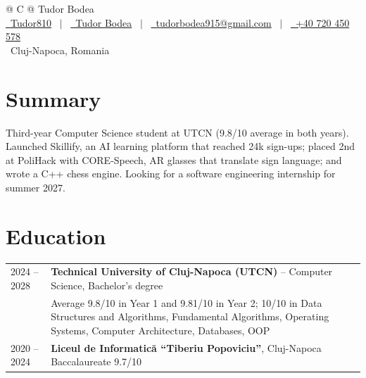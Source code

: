 \documentclass[a4paper,11pt]{article}
\begin{document}
\pagestyle{empty}

\begin{tabularx}{\linewidth}{@{} C @{}}
\Huge{Tudor Bodea} \\[7.5pt]
\href{https://github.com/Tudor810}{\raisebox{-0.05\height}{\faGithub}\ Tudor810} \ $|$ \
\href{https://www.linkedin.com/in/tudor-bodea-32ab5030b/}{\raisebox{-0.05\height}{\faLinkedin}\ Tudor Bodea} \ $|$ \
\href{mailto:tudorbodea915@gmail.com}{\raisebox{-0.05\height}{\faEnvelope}\ tudorbodea915@gmail.com} \ $|$ \
\href{tel:+40720450578}{\raisebox{-0.05\height}{\faMobile}\ +40 720 450 578} \\[2pt]
\raisebox{-0.05\height}{\faMapMarker}\ Cluj-Napoca, Romania \\
\end{tabularx}

\section{Summary}
Third-year Computer Science student at UTCN (9.8/10 average in both years). Launched Skillify, an AI learning platform that reached 24k sign-ups; placed 2nd at PoliHack with CORE-Speech, AR glasses that translate sign language; and wrote a C++ chess engine. Looking for a software engineering internship for summer 2027.

\section{Education}
\begin{tabularx}{\linewidth}{@{}l X@{}}
2024 -- 2028 & \textbf{Technical University of Cluj-Napoca (UTCN)} -- Computer Science, Bachelor's degree \\
 & Average 9.8/10 in Year 1 and 9.81/10 in Year 2; 10/10 in Data Structures and Algorithms, Fundamental Algorithms, Operating Systems, Computer Architecture, Databases, OOP \\[4pt]
2020 -- 2024 & \textbf{Liceul de Informatică ``Tiberiu Popoviciu''}, Cluj-Napoca \hfill Baccalaureate 9.7/10 \\
\end{tabularx}
\end{document}
